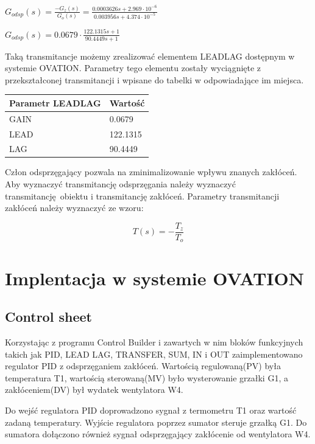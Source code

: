 \documentclass{mwrep}
\begin{document}
\vspace{3mm}
$G_{odsp}(s) = \frac{-G_{z}(s)}{G_{o}(s)} = \frac{0.0003626 s + 2.969 \cdot 10^{-6}}{0.003956 s + 4.374 \cdot 10^{-5}}$

\vspace{3mm}
$G_{odsp}(s) = 0.0679 \cdot \frac{122.1315s + 1}{90.4449s +1}$

\vspace{3mm}

Taką transmitancje możemy zrealizować elementem LEADLAG dostępnym w systemie OVATION. Parametry tego elementu zostały wyciągnięte z przekształconej transmitancji i wpisane do tabelki w odpowiadające im miejsca.

\begin{table}[H]
\begin{tabular}{l|l}
Parametr LEADLAG & Wartość  \\ \hline
GAIN             & 0.0679   \\
LEAD             & 122.1315 \\
LAG              & 90.4449 
\end{tabular}
\end{table}

Człon odsprzęgający pozwala na zminimalizowanie wpływu znanych zakłóceń. Aby wyznaczyć transmitancję odsprzęgania należy 
wyznaczyć transmitancję obiektu i transmitancję zakłóceń. Parametry transmitancji zakłóceń należy  wyznaczyć ze wzoru:

$$T(s) = - \frac{T_z}{T_o}$$


\chapter{Implentacja w systemie OVATION}
\label{OVATION}

\section{Control sheet}
\label{ControlSheet}

Korzystając z programu Control Builder i zawartych w nim bloków funkcyjnych takich jak PID, LEAD LAG, TRANSFER, SUM, IN i OUT zaimplementowano regulator PID z odsprzęganiem zakłóceń.  Wartością regulowaną(PV) była temperatura T1, wartością sterowaną(MV) było wysterowanie grzałki G1, a zakłóceniem(DV) był wydatek wentylatora W4.

Do wejść regulatora PID doprowadzono sygnał z termometru T1 oraz wartość zadaną temperatury. Wyjście regulatora poprzez sumator steruje grzałką G1. Do sumatora dołączono również sygnał odsprzęgający zakłócenie od wentylatora W4.
\end{document}
